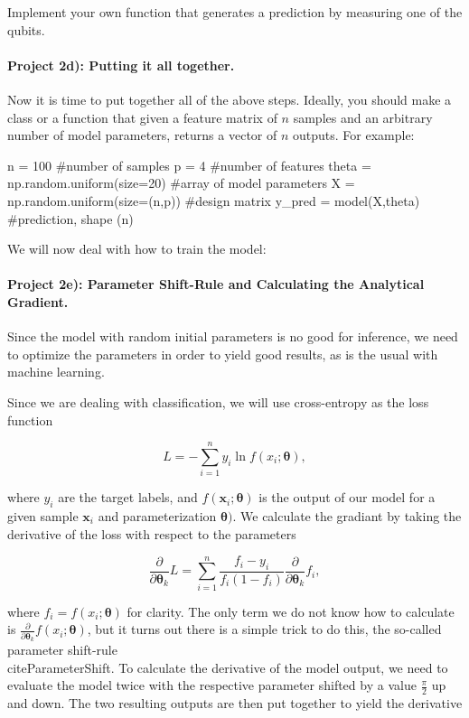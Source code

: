 \documentclass[%
oneside,                 %
final,                   %
10pt]{article}
\begin{document}
Implement your own function that generates a prediction by measuring one of the qubits.



\paragraph{Project 2d): Putting it all together.}
Now it is time to put together all of the above steps. Ideally, you
should make a class or a function that given a feature matrix of $n$
samples and an arbitrary number of model parameters, returns a vector
of $n$ outputs. For example:

\begin{print}
n = 100 #number of samples
p = 4 #number of features
theta = np.random.uniform(size=20) #array of model parameters
X = np.random.uniform(size=(n,p)) #design matrix
y_pred = model(X,theta) #prediction, shape (n)
\end{print}



We will now deal with how to train the model:

\paragraph{Project 2e): Parameter Shift-Rule and Calculating the Analytical Gradient.}
Since the model with random initial parameters is no good for
inference, we need to optimize the parameters in order to yield good
results, as is the usual with machine learning.

Since we are dealing with classification, we will use cross-entropy as the loss function

\begin{equation*}
    L = -\sum_{i=1}^{n}{y_i \ln{f(x_i;\boldsymbol{\theta})}},
\end{equation*}

where $y_i$ are the target labels, and
$f(\boldsymbol{x}_i;\boldsymbol{\theta})$ is the output of our model
for a given sample $\boldsymbol{x}_i$ and parameterization
$\boldsymbol{\theta})$. We calculate the gradiant by taking the
derivative of the loss with respect to the parameters

\begin{equation*}
    \frac{\partial}{\partial \boldsymbol{\theta}_k}L = \sum_{i=1}^{n}{\frac{f_i - y_i}{f_i(1 - f_i)}} \frac{\partial}{\partial \boldsymbol{\theta}_k}f_i,
\end{equation*}

where $f_i = f(x_i;\boldsymbol{\theta})$ for clarity. The only term we do not know how to calculate is $\frac{\partial}{\partial \boldsymbol{\theta}_k}f(x_i;\boldsymbol{\theta})$, but it turns out there is a simple trick to do this, the so-called parameter shift-rule \\cite{ParameterShift}. To calculate the derivative of the model output, we need to evaluate the model twice with the respective parameter shifted by a value $\frac{\pi}{2}$ up and down. The two resulting outputs are then put together to yield the derivative
\end{document}
